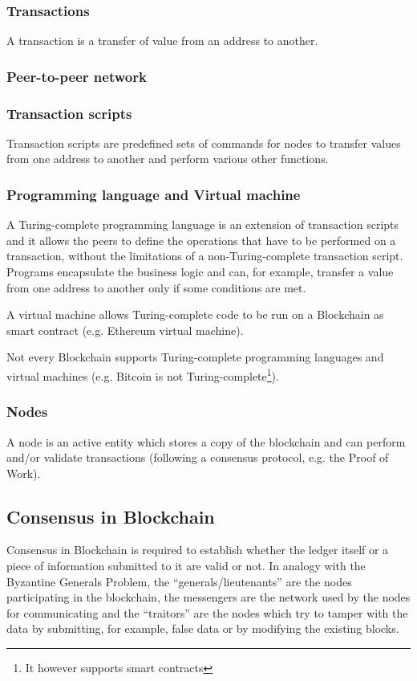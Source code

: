 \subsubsection*{Transactions}
A transaction is a transfer of value from an address to another.


\subsubsection*{Peer-to-peer network}


\subsubsection*{Transaction scripts}
Transaction scripts are predefined sets of commands for nodes to transfer values
from one address to another and perform various other functions.


\subsubsection*{Programming language and Virtual machine} A Turing-complete
programming language is an extension of transaction scripts and it allows the
peers to define the operations that have to be performed on a transaction,
without the limitations of a non-Turing-complete transaction script. Programs
encapsulate the business logic and can, for example, transfer a value from one
address to another only if some conditions are met.

A virtual machine allows Turing-complete code to be run on a Blockchain as
smart contract (e.g. Ethereum virtual machine).

Not every Blockchain supports Turing-complete programming languages and virtual
machines (e.g. Bitcoin is not Turing-complete\footnote{It however supports
smart contracts}).


\subsubsection*{Nodes}
A node is an active entity which stores a copy of the blockchain and can perform
and/or validate transactions (following a consensus protocol, e.g. the Proof of Work).









\subsection{Consensus in Blockchain} Consensus in Blockchain is required to
establish whether the ledger itself or a piece of information submitted to it
are valid or not. In analogy with the Byzantine Generals Problem, the
``generals/lieutenants'' are the nodes participating in the blockchain, the
messengers are the network used by the nodes for communicating and the
``traitors'' are the nodes which try to tamper with the data by submitting, for
example, false data or by modifying the existing blocks.

